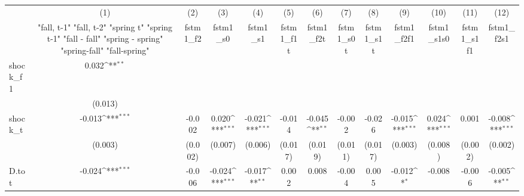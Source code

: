 {
\def\sym#1{\ifmmode^{#1}\else\(^{#1}\)\fi}
\begin{tabular}{l*{12}{c}}
\toprule
            &\multicolumn{1}{c}{(1)}&\multicolumn{1}{c}{(2)}&\multicolumn{1}{c}{(3)}&\multicolumn{1}{c}{(4)}&\multicolumn{1}{c}{(5)}&\multicolumn{1}{c}{(6)}&\multicolumn{1}{c}{(7)}&\multicolumn{1}{c}{(8)}&\multicolumn{1}{c}{(9)}&\multicolumn{1}{c}{(10)}&\multicolumn{1}{c}{(11)}&\multicolumn{1}{c}{(12)}\\
            &\multicolumn{1}{c}{  "fall, t-1" "fall, t-2" "spring t" "spring t-1"  "fall - fall" "spring - spring" "spring-fall" "fall-spring" }&\multicolumn{1}{c}{fstm1\_f2}&\multicolumn{1}{c}{fstm1\_s0}&\multicolumn{1}{c}{fstm1\_s1}&\multicolumn{1}{c}{fstm1\_f1t}&\multicolumn{1}{c}{fstm1\_f2t}&\multicolumn{1}{c}{fstm1\_s0t}&\multicolumn{1}{c}{fstm1\_s1t}&\multicolumn{1}{c}{fstm1\_f2f1}&\multicolumn{1}{c}{fstm1\_s1s0}&\multicolumn{1}{c}{fstm1\_s1f1}&\multicolumn{1}{c}{fstm1\_f2s1}\\
\midrule
shock\_f1    &       0.032\sym{**} &                     &                     &                     &                     &                     &                     &                     &                     &                     &                     &                     \\
            &     (0.013)         &                     &                     &                     &                     &                     &                     &                     &                     &                     &                     &                     \\
\addlinespace
shock\_t     &      -0.013\sym{***}&      -0.002         &       0.020\sym{***}&      -0.021\sym{***}&      -0.014         &      -0.045\sym{**} &      -0.002         &      -0.026         &      -0.015\sym{***}&       0.024\sym{***}&       0.001         &      -0.008\sym{***}\\
            &     (0.003)         &     (0.002)         &     (0.007)         &     (0.006)         &     (0.017)         &     (0.019)         &     (0.011)         &     (0.017)         &     (0.003)         &     (0.008)         &     (0.002)         &     (0.002)         \\
\addlinespace
D.tot       &      -0.024\sym{***}&      -0.006         &      -0.024\sym{***}&      -0.017\sym{**} &       0.002         &       0.008         &      -0.004         &       0.005         &      -0.012\sym{*}  &      -0.008         &      -0.006         &      -0.005\sym{**} \\

\end{tabular}}
